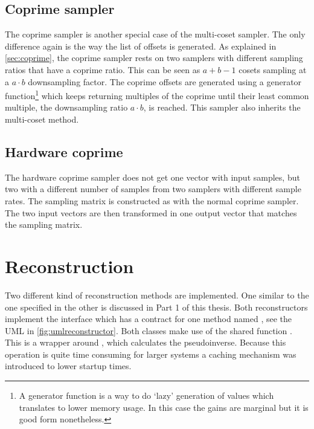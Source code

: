 \documentclass[a4paper, openany, oneside]{memoir}
\begin{document}
\subsection{Coprime sampler}
\label{sec:coprime-sampler}
The coprime sampler is another special case of the multi-coset sampler. The only difference again is the way the list of offsets is generated. As explained in \cref{sec:coprime}, the coprime sampler rests on two samplers with different sampling ratios that have a coprime ratio. This can be seen as $a + b - 1$ cosets sampling at a $a \cdot b$ downsampling factor. The coprime offsets are generated using a generator function\footnote{
    A generator function is a way to do `lazy' generation of values which translates to lower memory usage. In this case the gains are marginal but it is good form nonetheless.}
which keeps returning multiples of the coprime until their least common multiple, the downsampling ratio $a \cdot b$, is reached. This sampler also inherits the multi-coset  method.

\subsection{Hardware coprime}
\label{sec:hardware-coprime}
The hardware coprime sampler does not get one vector with input samples, but two with a different number of samples from two samplers with different sample rates. The sampling matrix is constructed as with the normal coprime sampler. The two input vectors are then transformed in one output vector that matches the sampling matrix.

\section{Reconstruction}
\label{sec:reconstruction}
Two different kind of reconstruction methods are implemented. One similar to the one specified in \cite{ariananda2012compressive} the other is discussed in Part 1 of this thesis. Both reconstructors implement the interface  which has a contract for one method named , see the UML in \cref{fig:umlreconstructor}. Both classes make use of the shared function . This is a wrapper around  , which calculates the pseudoinverse. Because this operation is quite time consuming for larger systems a caching mechanism was introduced to lower startup times.
\end{document}
